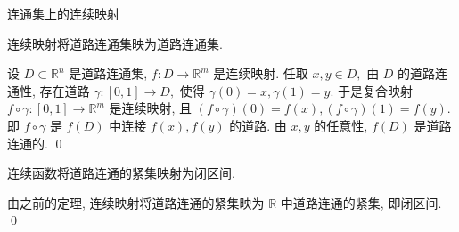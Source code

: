 \begin{frame}{连通集上的连续映射}

\begin{thm}
连续映射将道路连通集映为道路连通集.
\end{thm}

\pause
\vspace{1em}

\startproof[bg=yellow, fg=red]
设 $D \subset \mathbb{R}^n$ 是道路连通集, $f: D \to \mathbb{R}^m$ 是连续映射. 任取 $x, y \in D,$ 由 $D$ 的道路连通性, 存在道路 $\gamma: [0, 1] \to D,$ 使得 $\gamma(0) = x, \gamma(1) = y.$ 于是复合映射 $f \circ \gamma: [0, 1] \to \mathbb{R}^m$ 是连续映射, 且 $(f \circ \gamma)(0) = f(x), (f \circ \gamma)(1) = f(y).$ 即 $f \circ \gamma$ 是 $f(D)$ 中连接 $f(x), f(y)$ 的道路. 由 $x, y$ 的任意性, $f(D)$ 是道路连通的.
\qed


\pause
\vspace{1em}

\begin{cor}
连续函数将道路连通的紧集映射为闭区间.
\end{cor}

\pause
\vspace{1em}

\startproof[bg=yellow, fg=red]
由之前的定理, 连续映射将道路连通的紧集映为 $\mathbb{R}$ 中道路连通的紧集, 即闭区间.
\qed

\end{frame}



